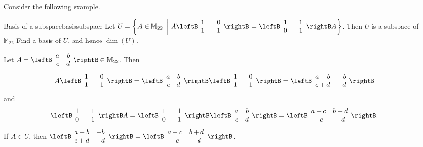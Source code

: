 Consider the following example.

\begin{example}{Basis of a subspace}{basissubspace}
Let $U=\left\{ A\in\mathbb{M}_{22} ~\left|~
A\leftB\begin{array}{rr}
1 & 0 \\ 1 & -1 \end{array}\rightB\right. 
= \leftB\begin{array}{rr}
1 & 1 \\ 0 & -1 \end{array}\rightB A \right\}$. 
Then $U$ is a subspace of $\mathbb{M}_{22}$ 
Find a basis of $U$, and hence $\dim(U)$.
\end{example}

\begin{solution}
Let $A=\leftB\begin{array}{rr} a & b \\ c & d \end{array}\rightB
\in\mathbb{M}_{22}$.
Then
\[ A\leftB\begin{array}{rr} 1 & 0 \\ 1 & -1 \end{array}\rightB
= \leftB\begin{array}{rr} a & b \\ c & d \end{array}\rightB
\leftB\begin{array}{rr} 1 & 0 \\ 1 & -1 \end{array}\rightB
=\leftB\begin{array}{rr} a+b & -b \\ c+d & -d \end{array}\rightB\]
and
\[ \leftB\begin{array}{rr} 1 & 1 \\ 0 & -1 \end{array}\rightB A
= \leftB\begin{array}{rr} 1 & 1 \\ 0 & -1 \end{array}\rightB
\leftB\begin{array}{rr} a & b \\ c & d \end{array}\rightB
=\leftB\begin{array}{cc} a+c & b+d \\ -c & -d \end{array}\rightB.\]
If $A\in U$, then
$\leftB\begin{array}{cc} a+b & -b \\ c+d & -d \end{array}\rightB=
\leftB\begin{array}{cc} a+c & b+d \\ -c & -d \end{array}\rightB$.


\end{solution}
